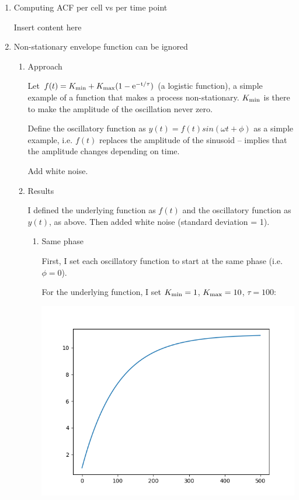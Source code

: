 \begin{enumerate}
\item Computing ACF per cell vs per time point
\label{sec:org8575590}

Insert content here

\item Non-stationary envelope function can be ignored
\label{sec:org638bcff}

\begin{enumerate}
\item Approach
\label{sec:org68672a6}

Let \(f(t) = K_{\rm{min}} + K_{\rm{max}}(1 - \rm{e}^{-t/\tau})\) (a logistic function), a simple example of a function that makes a process non-stationary.  \(K_{\rm{min}}\) is there to make the amplitude of the oscillation never zero.

Define the oscillatory function as \(y(t) = f(t)sin(\omega{}t + \phi)\) as a simple example, i.e. \(f(t)\) replaces the amplitude of the sinusoid -- implies that the amplitude changes depending on time.

Add white noise.

\item Results
\label{sec:org7f403a8}

I defined the underlying function as \(f(t)\) and the oscillatory function as \(y(t)\), as above.  Then added white noise (standard deviation = 1).

\begin{enumerate}
\item Same phase
\label{sec:org0e46814}

First, I set each oscillatory function to start at the same phase (i.e. \(\phi = 0\)).

For the underlying function, I set \(K_{\rm{min}} = 1\), \(K_{\rm{max}} = 10\), \(\tau = 100\):
\begin{center}
\includegraphics[width=.9\linewidth]{envelope_function_kmax10.png}
\end{center}


\end{enumerate}
\end{enumerate}
\end{enumerate}
